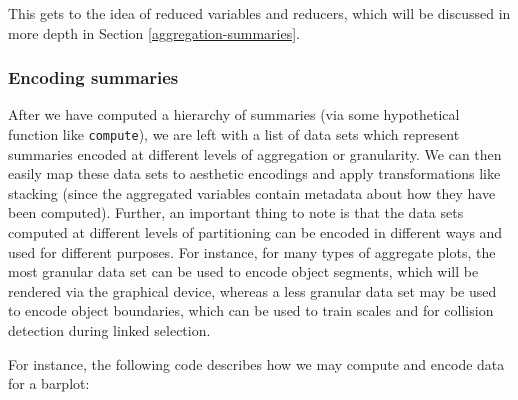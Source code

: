 \documentclass[
  openany]{book}
\newenvironment{Shaded}{\begin{snugshade}}{\end{snugshade}}
\newcommand{\AttributeTok}[1]{\textcolor[rgb]{0.13,0.29,0.53}{#1}}
\newcommand{\ConstantTok}[1]{\textcolor[rgb]{0.56,0.35,0.01}{#1}}
\newcommand{\ControlFlowTok}[1]{\textcolor[rgb]{0.13,0.29,0.53}{\textbf{#1}}}
\newcommand{\DecValTok}[1]{\textcolor[rgb]{0.00,0.00,0.81}{#1}}
\newcommand{\FunctionTok}[1]{\textcolor[rgb]{0.13,0.29,0.53}{\textbf{#1}}}
\newcommand{\NormalTok}[1]{#1}
\newcommand{\OtherTok}[1]{\textcolor[rgb]{0.56,0.35,0.01}{#1}}
\newcommand{\SpecialCharTok}[1]{\textcolor[rgb]{0.81,0.36,0.00}{\textbf{#1}}}
\newcommand{\StringTok}[1]{\textcolor[rgb]{0.31,0.60,0.02}{#1}}
\theoremstyle{definition}
\theoremstyle{definition}
\theoremstyle{definition}
\theoremstyle{definition}
\theoremstyle{remark}
\begin{document}
\begin{Shaded}
\end{Shaded}

This gets to the idea of reduced variables and reducers, which will be discussed in more depth in Section \ref{aggregation-summaries}.

\subsubsection{Encoding summaries}\label{encoding-summaries}

After we have computed a hierarchy of summaries (via some hypothetical function like \texttt{compute}), we are left with a list of data sets which represent summaries encoded at different levels of aggregation or granularity. We can then easily map these data sets to aesthetic encodings and apply transformations like stacking (since the aggregated variables contain metadata about how they have been computed). Further, an important thing to note is that the data sets computed at different levels of partitioning can be encoded in different ways and used for different purposes. For instance, for many types of aggregate plots, the most granular data set can be used to encode object segments, which will be rendered via the graphical device, whereas a less granular data set may be used to encode object boundaries, which can be used to train scales and for collision detection during linked selection.

For instance, the following code describes how we may compute and encode data for a barplot:
\end{document}
